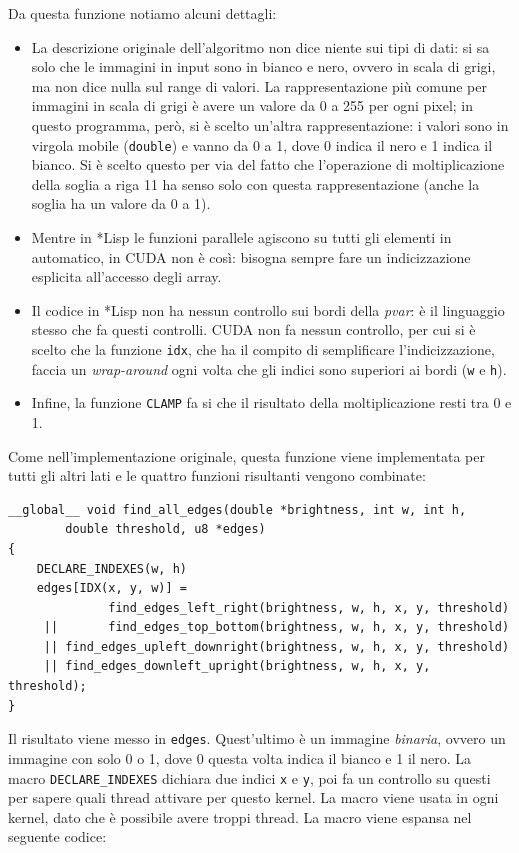 \documentclass[12pt,a4paper,openright,twoside]{report}
\begin{document}
Da questa funzione notiamo alcuni dettagli:

\begin{itemize}
    \item La descrizione originale dell'algoritmo non dice niente sui tipi di dati: si sa solo che le immagini in input sono in bianco e nero, ovvero in scala di grigi, ma non dice nulla sul range di valori. La rappresentazione più comune per immagini in scala di grigi è avere un valore da 0 a 255 per ogni pixel; in questo programma, però, si è scelto un'altra rappresentazione: i valori sono in virgola mobile (\verb|double|) e vanno da 0 a 1, dove 0 indica il nero e 1 indica il bianco. Si è scelto questo per via del fatto che l'operazione di moltiplicazione della soglia a riga 11 ha senso solo con questa rappresentazione (anche la soglia ha un valore da 0 a 1).
    \item Mentre in *Lisp le funzioni parallele agiscono su tutti gli elementi in automatico, in CUDA non è così: bisogna sempre fare un indicizzazione esplicita all'accesso degli array.
    \item Il codice in *Lisp non ha nessun controllo sui bordi della \textit{pvar}: è il linguaggio stesso che fa questi controlli. CUDA non fa nessun controllo, per cui si è scelto che la funzione \verb|idx|, che ha il compito di semplificare l'indicizzazione, faccia un \textit{wrap-around} ogni volta che gli indici sono superiori ai bordi (\verb|w| e \verb|h|).
    \item Infine, la funzione \verb|CLAMP| fa si che il risultato della moltiplicazione resti tra 0 e 1.
\end{itemize}

Come nell'implementazione originale, questa funzione viene implementata per tutti gli altri lati e le quattro funzioni risultanti vengono combinate:

\newpage

\begin{lstlisting}[style=mystyle]
__global__ void find_all_edges(double *brightness, int w, int h,
        double threshold, u8 *edges)
{
    DECLARE_INDEXES(w, h)
    edges[IDX(x, y, w)] =
              find_edges_left_right(brightness, w, h, x, y, threshold)
     ||       find_edges_top_bottom(brightness, w, h, x, y, threshold)
     || find_edges_upleft_downright(brightness, w, h, x, y, threshold)
     || find_edges_downleft_upright(brightness, w, h, x, y, threshold);
}
\end{lstlisting}

Il risultato viene messo in \verb|edges|. Quest'ultimo è un immagine \textit{binaria}, ovvero un immagine con solo 0 o 1, dove 0 questa volta indica il bianco e 1 il nero. La macro \verb|DECLARE_INDEXES| dichiara due indici \verb|x| e \verb|y|, poi fa un controllo su questi per sapere quali thread attivare per questo kernel. La macro viene usata in ogni kernel, dato che è possibile avere troppi thread. La macro viene espansa nel seguente codice:
\end{document}

